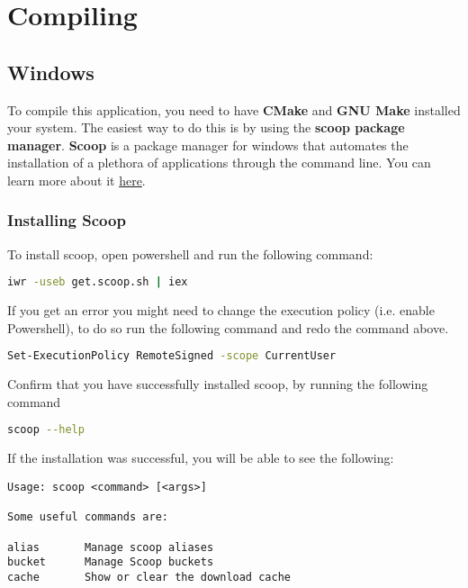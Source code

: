 \section{Compiling}
\subsection{Windows}

To compile this application, you need to have \textbf{CMake}  and \textbf{GNU
Make} installed your system.  The easiest way to do this is by using the \textbf{scoop
package manager}. \textbf{Scoop} is a package manager for windows that automates the
installation of a plethora of applications through the command line. You can learn more about it
\href{https://github.com/ScoopInstaller/Scoop}{here}.

\subsubsection{Installing Scoop}


To install scoop, open powershell and run the following command:

\begin{lstlisting}[language=bash]
iwr -useb get.scoop.sh | iex
\end{lstlisting}

If you get an error you might need to change the execution policy (i.e. enable Powershell), to do so run the following command and redo the command above.

\begin{lstlisting}[language=bash]
Set-ExecutionPolicy RemoteSigned -scope CurrentUser
\end{lstlisting}

Confirm that you have successfully installed scoop, by running the following command

\begin{lstlisting}[language=bash]
scoop --help
\end{lstlisting}

If the installation was successful, you will be able to see the following:
\begin{lstlisting}
Usage: scoop <command> [<args>]

Some useful commands are:

alias       Manage scoop aliases
bucket      Manage Scoop buckets
cache       Show or clear the download cache
\end{lstlisting}

